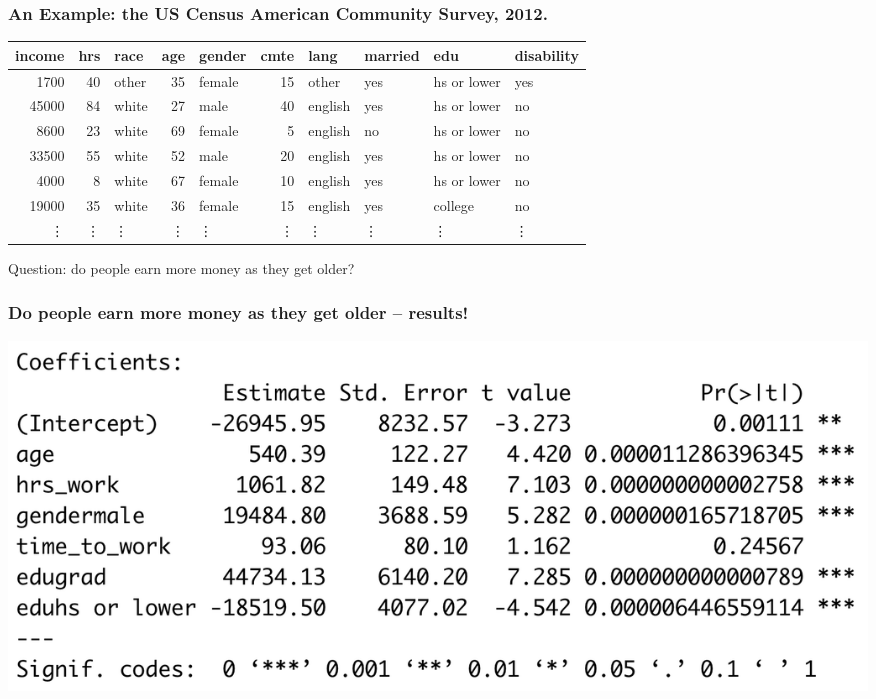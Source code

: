 \documentclass[aspectratio=169]{beamer}
\theoremstyle{principle}
\begin{document}
\begin{frame}
\frametitle{An Example: the US Census American Community Survey, 2012.}
\small
\begin{table}[ht]
\centering
\begin{tabular}{rrlrlrllll}
  \hline
\textbf{income}  & \textbf{hrs} & race & age & \textbf{gender} & \textbf{cmte} & lang & married & \textbf{edu} & disability \\ 
  \hline
 1700  &  40 & other &  35 & female  &  15 & other & yes & hs or lower & yes \\ 
 45000  &  84 & white &  27 & male  &  40 & english & yes & hs or lower & no \\ 
 8600  &  23 & white &  69 & female  &   5 & english & no & hs or lower & no \\ 
 33500  &  55 & white &  52 & male  &  20 & english & yes & hs or lower & no \\ 
 4000  &   8 & white &  67 & female  &  10 & english & yes & hs or lower & no \\ 
 19000  &  35 & white &  36 & female  &  15 & english & yes & college & no \\ 
\vdots &\vdots &\vdots &\vdots &\vdots &\vdots &\vdots &\vdots &\vdots &\vdots \\
   \hline
\end{tabular}
\end{table}
\bigskip\Large
\begin{center}
Question: do people earn more money as they get older?
\end{center}

\end{frame}

\begin{frame}
\frametitle{Do people earn more money as they get older -- results!}

\begin{center}
\includegraphics[scale=0.4]{income_v_age_full.png}
\end{center}

\end{frame}
\end{document}
